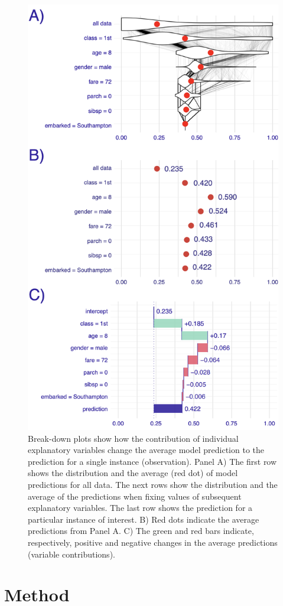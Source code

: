 \documentclass[]{krantz}
\begin{document}
\begin{figure}

{\centering \includegraphics[width=0.7\linewidth]{figure/break_down_distr} 

}

\caption{Break-down plots show how the contribution of individual explanatory variables change the average model prediction to the prediction for a single instance (observation). Panel A) The first row shows the distribution and the average (red dot) of model predictions for all data. The next rows show the distribution and the average of the predictions when fixing values of subsequent explanatory variables. The last row shows the prediction for a particular instance of interest. B) Red dots indicate the average predictions from Panel A. C) The green and red bars indicate, respectively, positive and negative changes in the average predictions (variable contributions). }\label{fig:BDPrice4}
\end{figure}

\hypertarget{BDMethod}{%
\section{Method}\label{BDMethod}}
\end{document}
